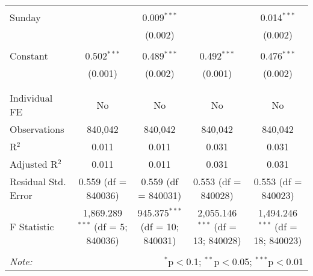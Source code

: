 \documentclass[
]{article}
\begin{document}
\begin{table}[!htbp]
{\begin{tabular}{@{\extracolsep{5pt}}lcccc}
  & & & & \\ 
 Sunday &  & 0.009$^{***}$ &  & 0.014$^{***}$ \\ 
  &  & (0.002) &  & (0.002) \\ 
  & & & & \\ 
 Constant & 0.502$^{***}$ & 0.489$^{***}$ & 0.492$^{***}$ & 0.476$^{***}$ \\ 
  & (0.001) & (0.002) & (0.001) & (0.002) \\ 
  & & & & \\ 
\hline \\[-1.8ex] 
Individual FE & No & No & No & No \\ 
Observations & 840,042 & 840,042 & 840,042 & 840,042 \\ 
R$^{2}$ & 0.011 & 0.011 & 0.031 & 0.031 \\ 
Adjusted R$^{2}$ & 0.011 & 0.011 & 0.031 & 0.031 \\ 
Residual Std. Error & 0.559 (df = 840036) & 0.559 (df = 840031) & 0.553 (df = 840028) & 0.553 (df = 840023) \\ 
F Statistic & 1,869.289$^{***}$ (df = 5; 840036) & 945.375$^{***}$ (df = 10; 840031) & 2,055.146$^{***}$ (df = 13; 840028) & 1,494.246$^{***}$ (df = 18; 840023) \\ 
\hline 
\hline \\[-1.8ex] 
\textit{Note:}  & \multicolumn{4}{r}{$^{*}$p$<$0.1; $^{**}$p$<$0.05; $^{***}$p$<$0.01} \\ 
\end{tabular}
} 
\end{table} 
\newpage
\end{document}
